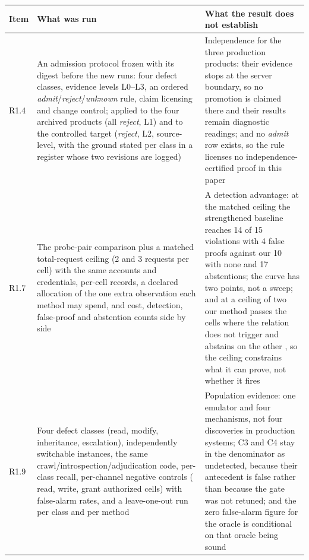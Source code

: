 \documentclass[10pt,letterpaper]{article}
\begin{document}
\begin{center}\small
\begin{tabular}{@{}p{}p{}p{}@{}}
\toprule
\textbf{Item} & \textbf{What was run} & \textbf{What the result does not establish} \\
\midrule
R1.4 & An admission protocol frozen with its digest before the new runs:
four defect classes, evidence levels L0--L3, an ordered
\emph{admit}/\emph{reject}/\emph{unknown} rule, claim licensing and change
control; applied to the four archived products (all \emph{reject}, L1) and to the
controlled target (\emph{reject}, L2, source-level, with the ground stated per
class in a register whose two revisions are logged) & Independence for the three
production products: their evidence stops at the server boundary, so no
promotion is claimed there and their results remain diagnostic readings; and no
\emph{admit} row exists, so the rule licenses no independence-certified proof in
this paper \\
R1.7 & The probe-pair comparison plus a matched total-request ceiling (2 and 3
requests per cell) with the same accounts and credentials, per-cell records, a
declared allocation of the one extra observation each method may spend, and cost,
detection, false-proof and abstention counts side by side & A detection
advantage: at the matched ceiling the strengthened baseline reaches 14 of 15
violations with 4 false proofs against our 10 with none and 17 abstentions; the
curve has two points, not a sweep; and at a ceiling of two our method passes the
\BgtOursPassCapTwo{} cells where the relation does not trigger and abstains on the
other \BgtOursAbstainCapTwo{}, so the ceiling constrains what it can prove, not
whether it fires \\
R1.9 & Four defect classes (read, modify, inheritance, escalation), \McInstances{}
independently switchable instances, the same crawl/introspection/adjudication
code, per-class recall, per-channel negative controls (\McNegRead{} read,
\McNegWrite{} write, \McNegGrant{} grant authorized cells) with false-alarm rates,
and a leave-one-out run per class and per method & Population
evidence: one emulator and four mechanisms, not four discoveries in production
systems; C3 and C4 stay in the denominator as undetected, because their
antecedent is false rather than because the gate was not retuned; and the zero
false-alarm figure for the oracle is conditional on that oracle being sound \\
\bottomrule
\end{tabular}
\end{center}
\end{document}

